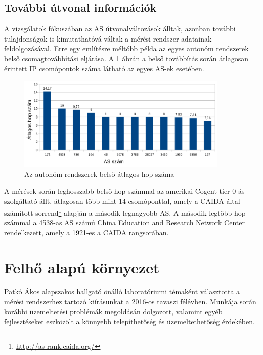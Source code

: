 \subsection{További útvonal információk}

A vizsgálatok fókuszában az AS útvonalváltozások álltak, azonban további tulajdonságok is kimutathatóvá váltak a mérési rendszer adatainak feldolgozásával. Erre egy említésre méltóbb példa az egyes autonóm rendszerek belső csomagtovábbítási eljárása. A \ref{fig:as-inside} ábrán a belső továbbítás során átlagosan érintett IP csomópontok száma látható az egyes AS-ek esetében.

\begin{figure}[!ht]
	\centering
	\includegraphics[width=0.9\textwidth, keepaspectratio]{figures/as-inside.PNG}
	\caption{Az autonóm rendszerek belső átlagos hop száma}
	\label{fig:as-inside}
\end{figure}

A mérések során leghosszabb belső hop számmal az amerikai Cogent tier 0-ás szolgáltató állt, átlagosan több mint 14 csomóponttal, amely a CAIDA által számított sorrend\footnote{\url{http://as-rank.caida.org/}} alapján a második legnagyobb AS. A második legtöbb hop számmal a 4538-as AS számú China Education and Research Network Center rendelkezett, amely a 1921-es a CAIDA rangsorában.


\section{Felhő alapú környezet}


Patkó Ákos alapszakos hallgató önálló laboratóriumi témaként választotta a mérési rendszerhez tartozó kiírásunkat a 2016-os tavaszi félévben. Munkája során korábbi üzemeltetési problémák megoldásán dolgozott, valamint egyéb fejlesztéseket eszközölt a könnyebb telepíthetőség és üzemeltethetőség érdekében.


